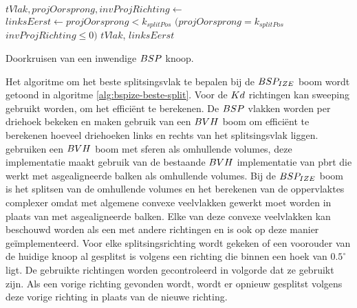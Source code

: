 \begin{dutchalgorithm}
    \begin{algorithmic}       
            \State $tVlak, projOorsprong, invProjRichting \gets $ 
            \State $linksEerst \gets projOorsprong < k_{splitPos}$ \Or $(projOorsprong = k_{splitPos}$ \And $invProjRichting \leq 0)$
            \State \Return $tVlak$, $linksEerst$
        \EndFunction
    \end{algorithmic}
    \caption{Doorkruisen van een inwendige $BSP$ knoop.}
    \label{alg:bsp-inwendige-doorkruising}
\end{dutchalgorithm}

Het algoritme om het beste splitsingsvlak te bepalen bij de $BSP_{IZE}$ boom wordt getoond in algoritme \ref{alg:bspize-beste-split}.
Voor de $Kd$ richtingen kan sweeping gebruikt worden, om het efficiënt te berekenen.
De $BSP$ vlakken worden per driehoek bekeken en maken gebruik van een $BVH$ boom om efficiënt te berekenen hoeveel driehoeken links en rechts van het splitsingsvlak liggen.
\authorIze{} \cite{ize} gebruiken een $BVH$ boom met sferen als omhullende volumes, deze implementatie maakt gebruik van de bestaande $BVH$ implementatie van pbrt die werkt met asgealigneerde balken als omhullende volumes.
Bij de $BSP_{IZE}$ boom is het splitsen van de omhullende volumes en het berekenen van de oppervlaktes complexer omdat met algemene convexe veelvlakken gewerkt moet worden in plaats van met asgealigneerde balken.
Elke van deze convexe veelvlakken kan beschouwd worden als een \symKDOP{} met andere richtingen en is ook op deze manier geïmplementeerd.
Voor elke splitsingsrichting wordt gekeken of een voorouder van de huidige knoop al gesplitst is volgens een richting die binnen een hoek van $0.5^{\circ}$ ligt. 
De gebruikte richtingen worden gecontroleerd in volgorde dat ze gebruikt zijn.
Als een vorige richting gevonden wordt, wordt er opnieuw gesplitst volgens deze vorige richting in plaats van de nieuwe richting.


